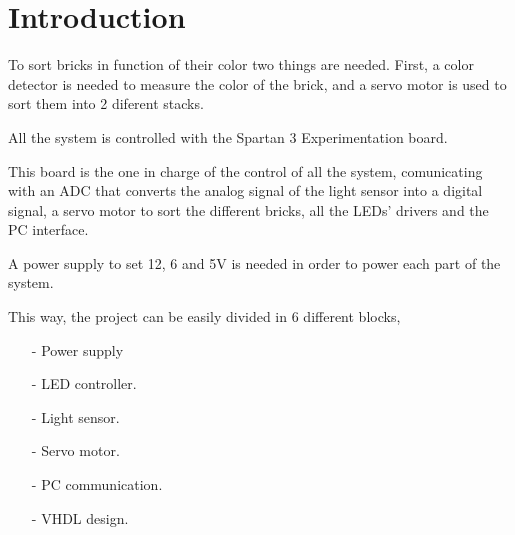 
\section{Introduction}
To sort bricks in function of their color two things are needed. First, a color detector is needed to measure the color of the brick, and a servo motor is used to sort them into 2 diferent stacks.

All the system is controlled with the Spartan 3 Experimentation board.

This board is the one in charge of the control of all the system, comunicating with an ADC that converts the analog signal of the light sensor into a digital signal, a servo motor to sort the different bricks, all the LEDs' drivers and the PC interface.

A power supply to set 12, 6 and 5V is needed in order to power each part of the system.

This way, the project can be easily divided in 6 different blocks,

\begin{itemize}
\item [-] Power supply
\item [-] LED controller.
\item [-] Light sensor.
\item [-] Servo motor.
\item [-] PC communication.
\item [-] VHDL design.
\end{itemize}
	